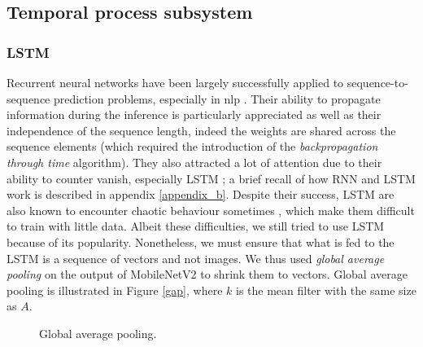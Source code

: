 \documentclass[12pt, a4paper]{report}
\begin{document}
			\subsection{Temporal process subsystem}\label{lstm}
				\subsubsection{LSTM}\label{lstm}
					Recurrent neural networks have been largely successfully applied to sequence-to-sequence prediction problems, especially in \gls{nlp} \cite{wu2016google,shen2018natural,miao2020application}.
					Their ability to propagate information during the inference is particularly appreciated as well as their independence of the sequence length, indeed the weights are shared across the sequence elements (which required the introduction of the {\itshape backpropagation through time} algorithm).
					They also attracted a lot of attention due to their ability to counter \gls{vanish}, especially LSTM \cite{Hochreiter1997lstm}; a brief recall of how RNN and LSTM work is described in appendix \ref{appendix_b}.
					Despite their success, LSTM are also known to encounter chaotic behaviour sometimes \cite{bertschinger2004,laurent2016recurrent}, which make them difficult to train with little data.
					Albeit these difficulties, we still tried to use LSTM because of its popularity.
					Nonetheless, we must ensure that what is fed to the LSTM is a sequence of vectors and not images.
					We thus used {\itshape global average pooling} on the output of MobileNetV2 to shrink them to vectors.
					Global average pooling is illustrated in Figure \ref{gap}, where $k$ is the mean filter with the same size as $A$.
					\begin{figure}[h!]
						\centering
						\caption{Global average pooling.}
					\end{figure}
\end{document}
